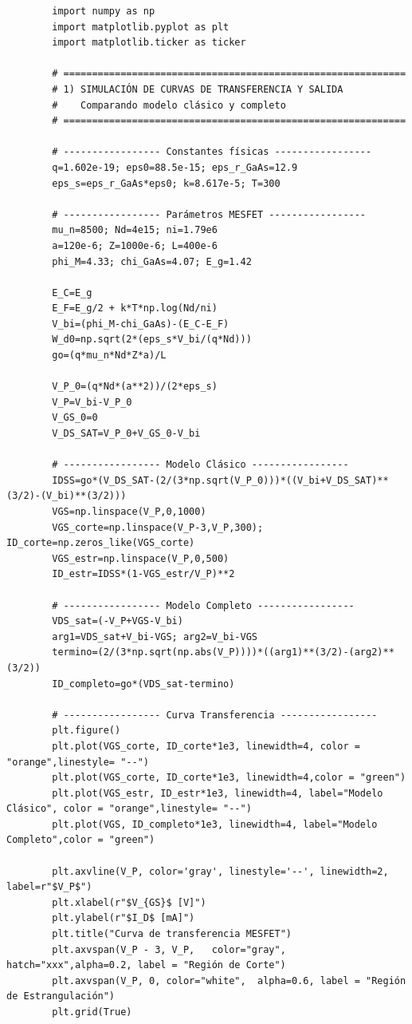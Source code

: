 \documentclass[a4paper]{article}
\begin{document}
\begin{verbatim}
		import numpy as np
		import matplotlib.pyplot as plt
		import matplotlib.ticker as ticker
		
		# ============================================================
		# 1) SIMULACIÓN DE CURVAS DE TRANSFERENCIA Y SALIDA
		#    Comparando modelo clásico y completo
		# ============================================================
		
		# ----------------- Constantes físicas -----------------
		q=1.602e-19; eps0=88.5e-15; eps_r_GaAs=12.9
		eps_s=eps_r_GaAs*eps0; k=8.617e-5; T=300
		
		# ----------------- Parámetros MESFET -----------------
		mu_n=8500; Nd=4e15; ni=1.79e6
		a=120e-6; Z=1000e-6; L=400e-6
		phi_M=4.33; chi_GaAs=4.07; E_g=1.42
		
		E_C=E_g
		E_F=E_g/2 + k*T*np.log(Nd/ni)
		V_bi=(phi_M-chi_GaAs)-(E_C-E_F)
		W_d0=np.sqrt(2*(eps_s*V_bi/(q*Nd)))
		go=(q*mu_n*Nd*Z*a)/L
		
		V_P_0=(q*Nd*(a**2))/(2*eps_s)
		V_P=V_bi-V_P_0
		V_GS_0=0
		V_DS_SAT=V_P_0+V_GS_0-V_bi
		
		# ----------------- Modelo Clásico -----------------
		IDSS=go*(V_DS_SAT-(2/(3*np.sqrt(V_P_0)))*((V_bi+V_DS_SAT)**(3/2)-(V_bi)**(3/2)))
		VGS=np.linspace(V_P,0,1000)
		VGS_corte=np.linspace(V_P-3,V_P,300); ID_corte=np.zeros_like(VGS_corte)
		VGS_estr=np.linspace(V_P,0,500)
		ID_estr=IDSS*(1-VGS_estr/V_P)**2
		
		# ----------------- Modelo Completo -----------------
		VDS_sat=(-V_P+VGS-V_bi)
		arg1=VDS_sat+V_bi-VGS; arg2=V_bi-VGS
		termino=(2/(3*np.sqrt(np.abs(V_P))))*((arg1)**(3/2)-(arg2)**(3/2))
		ID_completo=go*(VDS_sat-termino)
		
		# ----------------- Curva Transferencia -----------------
		plt.figure()
		plt.plot(VGS_corte, ID_corte*1e3, linewidth=4, color = "orange",linestyle= "--")
		plt.plot(VGS_corte, ID_corte*1e3, linewidth=4,color = "green")
		plt.plot(VGS_estr, ID_estr*1e3, linewidth=4, label="Modelo Clásico", color = "orange",linestyle= "--")
		plt.plot(VGS, ID_completo*1e3, linewidth=4, label="Modelo Completo",color = "green")
		
		plt.axvline(V_P, color='gray', linestyle='--', linewidth=2, label=r"$V_P$")
		plt.xlabel(r"$V_{GS}$ [V]")
		plt.ylabel(r"$I_D$ [mA]")
		plt.title("Curva de transferencia MESFET")
		plt.axvspan(V_P - 3, V_P,   color="gray", hatch="xxx",alpha=0.2, label = "Región de Corte")
		plt.axvspan(V_P, 0, color="white",  alpha=0.6, label = "Región de Estrangulación")
		plt.grid(True)
		

\end{verbatim}
\end{document}
